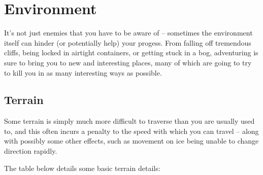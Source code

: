 \chapter{Environment}

It's not just enemies that you have to be aware of -- sometimes the environment itself can hinder (or potentially help) your progess. From falling off tremendous cliffs, being locked in airtight containers, or getting stuck in a bog, adventuring is sure to bring you to new and interesting places, many of which are going to try to kill you in as many interesting ways as possible. 



\section{Terrain}

Some terrain is simply much more difficult to traverse than you are usually used to, and this often incurs a penalty to the speed with which you can travel -- along with possibly some other effects, such as movement on ice being unable to change direction rapidly. 

The table below details some basic terrain details:
\def\y{4.4}


